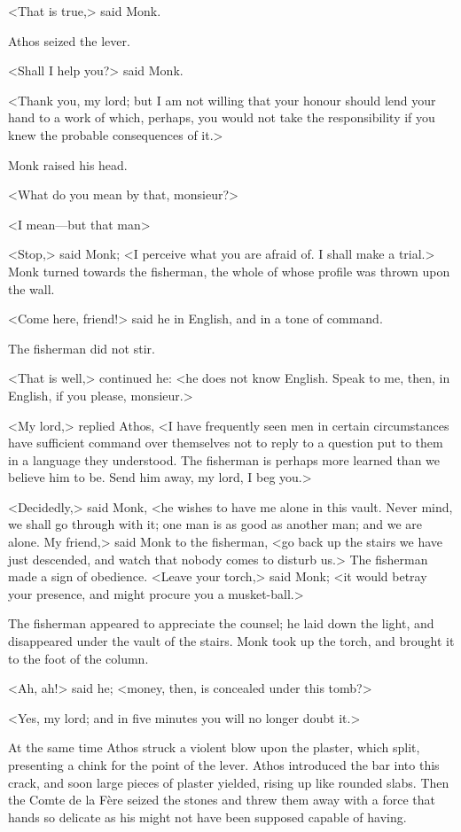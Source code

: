 <That is true,> said Monk.

Athos seized the lever.

<Shall I help you?> said Monk.

<Thank you, my lord; but I am not willing that your honour should lend your hand to a work of which, perhaps, you would not take the responsibility if you knew the probable consequences of it.>

Monk raised his head.

<What do you mean by that, monsieur?>

<I mean—but that man\longdash>

<Stop,> said Monk; <I perceive what you are afraid of. I shall make a trial.> Monk turned towards the fisherman, the whole of whose profile was thrown upon the wall.

<Come here, friend!> said he in English, and in a tone of command.

The fisherman did not stir.

<That is well,> continued he: <he does not know English. Speak to me, then, in English, if you please, monsieur.>

<My lord,> replied Athos, <I have frequently seen men in certain circumstances have sufficient command over themselves not to reply to a question put to them in a language they understood. The fisherman is perhaps more learned than we believe him to be. Send him away, my lord, I beg you.>

<Decidedly,> said Monk, <he wishes to have me alone in this vault. Never mind, we shall go through with it; one man is as good as another man; and we are alone. My friend,> said Monk to the fisherman, <go back up the stairs we have just descended, and watch that nobody comes to disturb us.> The fisherman made a sign of obedience. <Leave your torch,> said Monk; <it would betray your presence, and might procure you a musket-ball.>

The fisherman appeared to appreciate the counsel; he laid down the light, and disappeared under the vault of the stairs. Monk took up the torch, and brought it to the foot of the column.

<Ah, ah!> said he; <money, then, is concealed under this tomb?>

<Yes, my lord; and in five minutes you will no longer doubt it.>

At the same time Athos struck a violent blow upon the plaster, which split, presenting a chink for the point of the lever. Athos introduced the bar into this crack, and soon large pieces of plaster yielded, rising up like rounded slabs. Then the Comte de la Fère seized the stones and threw them away with a force that hands so delicate as his might not have been supposed capable of having.

